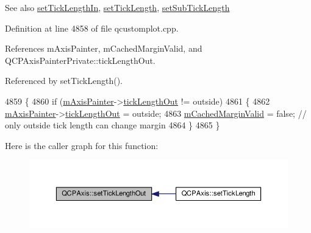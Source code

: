 \begin{DoxySeeAlso}{See also}
\hyperlink{class_q_c_p_axis_afae1a37a99611366275a51204d991739}{set\+Tick\+Length\+In}, \hyperlink{class_q_c_p_axis_a62ec40bebe3540e9c1479a8fd2be3b0d}{set\+Tick\+Length}, \hyperlink{class_q_c_p_axis_ab702d6fd42fc620607435339a1c2a2e1}{set\+Sub\+Tick\+Length} 
\end{DoxySeeAlso}


Definition at line 4858 of file qcustomplot.\+cpp.



References m\+Axis\+Painter, m\+Cached\+Margin\+Valid, and Q\+C\+P\+Axis\+Painter\+Private\+::tick\+Length\+Out.



Referenced by set\+Tick\+Length().


\begin{DoxyCode}
4859 \{
4860   \textcolor{keywordflow}{if} (\hyperlink{class_q_c_p_axis_aeeae00935bd2dab82d64f32544a90913}{mAxisPainter}->\hyperlink{class_q_c_p_axis_painter_private_acbebb1f868906200f968627bc907b77d}{tickLengthOut} != outside)
4861   \{
4862     \hyperlink{class_q_c_p_axis_aeeae00935bd2dab82d64f32544a90913}{mAxisPainter}->\hyperlink{class_q_c_p_axis_painter_private_acbebb1f868906200f968627bc907b77d}{tickLengthOut} = outside;
4863     \hyperlink{class_q_c_p_axis_a2cde37b6e385f47e11322df4ac1b0e9b}{mCachedMarginValid} = \textcolor{keyword}{false}; \textcolor{comment}{// only outside tick length can change margin}
4864   \}
4865 \}
\end{DoxyCode}


Here is the caller graph for this function\+:\nopagebreak
\begin{figure}[H]
\begin{center}
\leavevmode
\includegraphics[width=350pt]{class_q_c_p_axis_a3b8a0debd1ffedd2c22d0592dfbb4e62_icgraph}
\end{center}
\end{figure}


\hypertarget{class_q_c_p_axis_ad80923bcc1c5da4c4db602c5325e797e}{}
